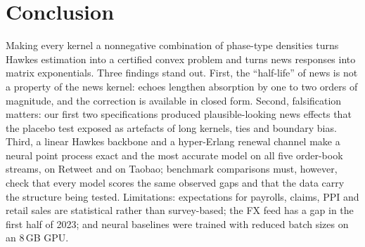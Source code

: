 \section{Conclusion}\label{sec:conclusion}
Making every kernel a nonnegative combination of phase-type densities turns Hawkes
estimation into a certified convex problem and turns news responses into matrix
exponentials. Three findings stand out. First, the ``half-life'' of news is not a
property of the news kernel: echoes lengthen absorption by one to two orders of
magnitude, and the correction is available in closed form. Second, falsification
matters: our first two specifications produced plausible-looking news effects that the
placebo test exposed as artefacts of long kernels, ties and boundary bias. Third, a
linear Hawkes backbone and a hyper-Erlang renewal channel make a neural point process
exact and the most accurate model on all five order-book streams, on Retweet and on Taobao;
benchmark comparisons must, however, check that every model scores the same observed gaps and
that the data carry the structure being tested. Limitations: expectations for payrolls, claims, PPI and retail sales
are statistical rather than survey-based; the FX feed has a gap in the first half of
2023; and neural baselines were trained with reduced batch sizes on an 8\,GB GPU.
